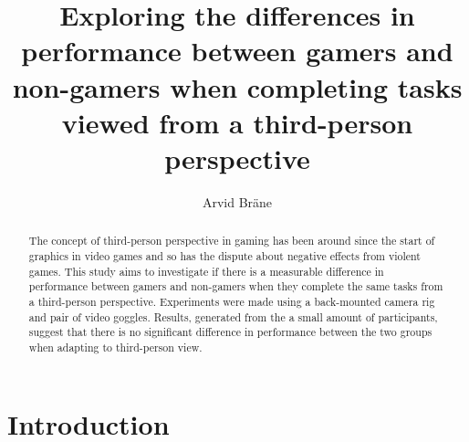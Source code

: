 \documentclass[runningheads,a4paper,oribibl]{llncs}
\begin{document}
\pagestyle{headings}

\mainmatter

\title{Exploring the differences in performance between gamers and non-gamers when completing tasks viewed from a third-person perspective}



\author{Arvid Bräne}


\maketitle


\begin{abstract}
The concept of third-person perspective in gaming has been around since the start of graphics in video games and so has the dispute about negative effects from violent games. This study aims to investigate if there is a measurable difference in performance between gamers and non-gamers when they complete the same tasks from a third-person perspective. Experiments were made using a back-mounted camera rig and pair of video goggles. Results, generated from the a small amount of participants, suggest that there is no significant difference in performance between the two groups when adapting to third-person view.
	


\end{abstract}











\section{Introduction}
\end{document}
